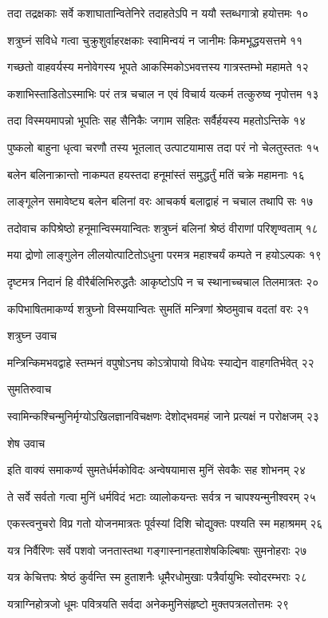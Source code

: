 तदा तद्रक्षकाः सर्वे कशाघातान्वितेनिरे
तदाहतेऽपि न ययौ स्तब्धगात्रो हयोत्तमः १०

शत्रुघ्नं सविधे गत्वा चुक्रुशुर्वाहरक्षकाः
स्वामिन्वयं न जानीमः किमभूद्धयसत्तमे ११

गच्छतो वाहवर्यस्य मनोवेगस्य भूपते
आकस्मिकोऽभवत्तस्य गात्रस्तम्भो महामते १२

कशाभिस्ताडितोऽस्माभिः परं तत्र चचाल न
एवं विचार्य यत्कर्म तत्कुरुष्व नृपोत्तम १३

तदा विस्मयमापन्नो भूपतिः सह सैनिकैः
जगाम सहितः सर्वैर्हयस्य महतोऽन्तिके १४

पुष्कलो बाहुना धृत्वा चरणौ तस्य भूतलात्
उत्पाटयामास तदा परं नो चेलतुस्ततः १५

बलेन बलिनाक्रान्तो नाकम्पत हयस्तदा
हनूमांस्तं समुद्धर्तुं मतिं चक्रे महामनाः १६

लाङ्गूलेन समावेष्ट्य बलेन बलिनां वरः
आचकर्ष बलाद्वाहं न चचाल तथापि सः १७

तदोवाच कपिश्रेष्ठो हनूमान्विस्मयान्वितः
शत्रुघ्नं बलिनां श्रेष्ठं वीराणां परिशृण्वताम् १८

मया द्रोणो लाङ्गुलेन लीलयोत्पाटितोऽधुना
परमत्र महाश्चर्यं कम्पते न हयोऽल्पकः १९

दृष्टमत्र निदानं हि वीरैर्बलिभिरुद्धतैः
आकृष्टोऽपि न च स्थानाच्चचाल तिलमात्रतः २०

कपिभाषितमाकर्ण्य शत्रुघ्नो विस्मयान्वितः
सुमतिं मन्त्रिणां श्रेष्ठमुवाच वदतां वरः २१

शत्रुघ्न उवाच

मन्त्रिन्किमभवद्वाहे स्तम्भनं वपुषोऽनघ
कोऽत्रोपायो विधेयः स्याद्येन वाहगतिर्भवेत् २२

सुमतिरुवाच

स्वामिन्कश्चिन्मुनिर्मृग्योऽखिलज्ञानविचक्षणः
देशोद्भवमहं जाने प्रत्यक्षं न परोक्षजम् २३

शेष उवाच

इति वाक्यं समाकर्ण्य सुमतेर्धर्मकोविदः
अन्वेषयामास मुनिं सेवकैः सह शोभनम् २४

ते सर्वे सर्वतो गत्वा मुनिं धर्मविदं भटाः
व्यालोकयन्तः सर्वत्र न चापश्यन्मुनीश्वरम् २५

एकस्त्वनुचरो विप्र गतो योजनमात्रतः
पूर्वस्यां दिशि चोद्युक्तः पश्यति स्म महाश्रमम् २६

यत्र निर्वैरिणः सर्वे पशवो जनतास्तथा
गङ्गास्नानहताशेषकिल्बिषाः सुमनोहराः २७

यत्र केचित्तपः श्रेष्ठं कुर्वन्ति स्म हुताशनैः
धूमैरधोमुखाः पत्रैर्वायुभिः स्वोदरम्भराः २८

यत्राग्निहोत्रजो धूमः पवित्रयति सर्वदा
अनेकमुनिसंहृष्टो मुक्तपत्रलतोत्तमः २९

